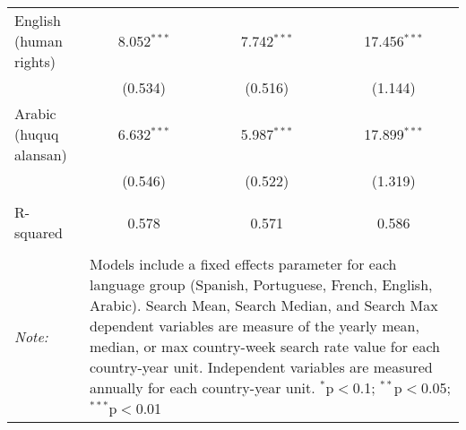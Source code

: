 \begin{table}[!htbp]
\begin{tabular}{@{\extracolsep{5pt}}lccc}
  English (human rights) & 8.052$^{***}$ & 7.742$^{***}$ & 17.456$^{***}$ \\ 
  & (0.534) & (0.516) & (1.144) \\ 
  Arabic (huquq alansan) & 6.632$^{***}$ & 5.987$^{***}$ & 17.899$^{***}$ \\ 
  & (0.546) & (0.522) & (1.319) \\ 
 \hline \\[-1.8ex] 
R-squared  & 0.578 & 0.571 & 0.586 \\ 
\hline 
\hline \\[-1.8ex] 
\textit{Note:}  & \multicolumn{3}{l}{\parbox[t]{8cm}{Models include a fixed effects parameter for each language group (Spanish, Portuguese, French, English, Arabic). Search Mean, Search Median, and Search Max dependent variables are measure of the yearly mean, median, or max country-week search rate value for each country-year unit. Independent variables are measured annually for each country-year unit. $^{*}$p$<$0.1; $^{**}$p$<$0.05; $^{***}$p$<$0.01}} \\ 
\end{tabular} 
\end{table} 
